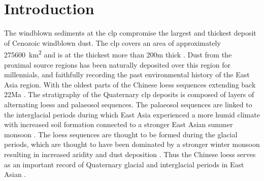 \thispagestyle{plain}
\chapter*{Introduction}
The windblown sediments at the \acrfull{clp} compromise the largest and thickest deposit of Cenozoic windblown dust. The \acrshort{clp} covers an area of approximately \SI{275600}{\kilo\metre\squared} and is at the thickest more than 200\si{\metre} thick .
Dust from the proximal source regions has been naturally deposited over this region for millennials, and faithfully recording the past environmental history of the East Asia region. With the oldest parts of the Chinese loess sequences extending back 22Ma \parencite{qiang2011new}. The stratigraphy of the Quaternary \acrshort{clp} deposits is composed of layers of alternating loess and palaeosol sequences. The palaeosol sequences are linked to the interglacial periods during which East Asia experienced a more humid climate with increased soil formation connected to a stronger East Asian summer monsoon . The loess sequences are thought to be formed during the glacial periods, which are thought to have been dominated by a stronger winter monsoon resulting in increased aridity and dust deposition . Thus the Chinese loess serves as an important record of Quaternary glacial and interglacial periods in East Asian .

